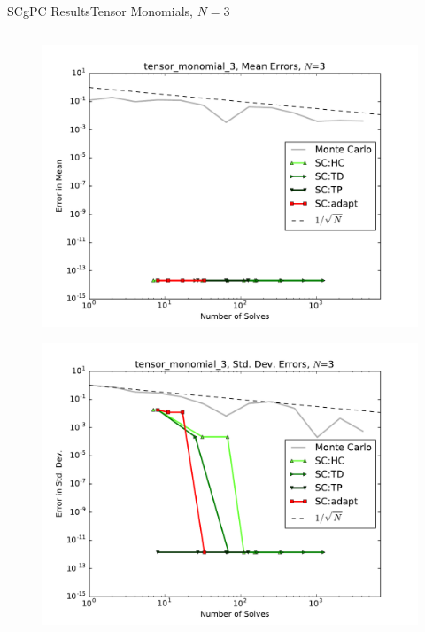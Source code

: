\documentclass{beamer}
\begin{document}
\begin{frame}{SCgPC Results}{Tensor Monomials, $N=3$}
\begin{columns}
\begin{column}{0.5\textwidth}
\begin{figure}[h!]
          \includegraphics[width=0.8\linewidth]{anlmodels/tensor_monomial_3_mean_errs_nohdmr}
        \end{figure}
        \vspace{-20pt}
        \begin{figure}[h!]
          \centering
          \includegraphics[width=0.8\linewidth]{anlmodels/tensor_monomial_3_variance_errs_nohdmr}
        \end{figure}
   \end{column}
 \end{columns}
\end{frame}
\end{document}
